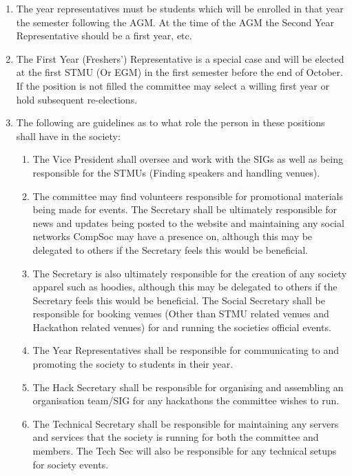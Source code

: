 \begin {enumerate}
  \item The year representatives must be students which will be enrolled in that year the semester
    following the AGM. At the time of the AGM the Second Year Representative should be a first year, etc.

  \item The First Year (Freshers') Representative is a special case and will be elected at the first STMU (Or EGM)
    in the first semester before the end of October. If the position is not filled the committee may select a
    willing first year or hold subsequent re-elections.

  \item The following are guidelines as to what role the person in these positions shall have in the society:
    \begin{enumerate}
      \item The Vice President shall oversee and work with the SIGs as well as
        being responsible for the STMUs (Finding speakers and handling venues).
      \item The committee may find volunteers responsible for promotional materials
        being made for events. The Secretary shall be ultimately
        responsible for news and updates being posted to the website and
        maintaining any social networks CompSoc may have a presence on,
        although this may be delegated to others if the Secretary feels this
        would be beneficial.
      \item The Secretary is also ultimately responsible for the creation of any
        society apparel such as hoodies, although this may be delegated to others
        if the Secretary feels this would be beneficial. The Social Secretary
        shall be responsible for booking venues (Other than STMU related venues
        and Hackathon related venues) for and running the societies
        official events.
      \item The Year Representatives shall be responsible for communicating to
        and promoting the society to students in their year.
      \item The Hack Secretary shall be responsible for organising and assembling
        an organisation team/SIG for any hackathons the committee wishes to run.
      \item The Technical Secretary shall be responsible for maintaining any servers
        and services that the society is running for both the committee and members.
        The Tech Sec will also be responsible for any technical setups for society events.
    \end{enumerate}


\end{enumerate}
